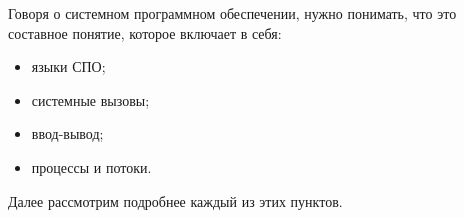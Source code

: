 Говоря о системном программном обеспечении, нужно понимать, что это составное понятие, которое включает в себя:

\begin{itemize}
	\item языки СПО;
	\item системные вызовы;
	\item ввод-вывод;
	\item процессы и потоки.
\end{itemize}

Далее рассмотрим подробнее каждый из этих пунктов.